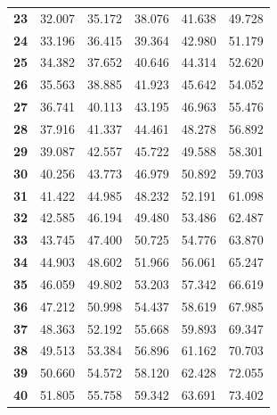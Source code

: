 \begin{center}
\begin{tabular}{c|c|c|c|c|c}
\textbf{23} & 32.007 & 35.172 & 38.076 & 41.638 & 49.728 \\
\textbf{24} & 33.196 & 36.415 & 39.364 & 42.980 & 51.179 \\
\textbf{25} & 34.382 & 37.652 & 40.646 & 44.314 & 52.620 \\
\textbf{26} & 35.563 & 38.885 & 41.923 & 45.642 & 54.052 \\
\textbf{27} & 36.741 & 40.113 & 43.195 & 46.963 & 55.476 \\
\textbf{28} & 37.916 & 41.337 & 44.461 & 48.278 & 56.892 \\
\textbf{29} & 39.087 & 42.557 & 45.722 & 49.588 & 58.301 \\
\textbf{30} & 40.256 & 43.773 & 46.979 & 50.892 & 59.703 \\
\textbf{31} & 41.422 & 44.985 & 48.232 & 52.191 & 61.098 \\
\textbf{32} & 42.585 & 46.194 & 49.480 & 53.486 & 62.487 \\
\textbf{33} & 43.745 & 47.400 & 50.725 & 54.776 & 63.870 \\
\textbf{34} & 44.903 & 48.602 & 51.966 & 56.061 & 65.247 \\
\textbf{35} & 46.059 & 49.802 & 53.203 & 57.342 & 66.619 \\
\textbf{36} & 47.212 & 50.998 & 54.437 & 58.619 & 67.985 \\
\textbf{37} & 48.363 & 52.192 & 55.668 & 59.893 & 69.347 \\
\textbf{38} & 49.513 & 53.384 & 56.896 & 61.162 & 70.703 \\
\textbf{39} & 50.660 & 54.572 & 58.120 & 62.428 & 72.055 \\
\textbf{40} & 51.805 & 55.758 & 59.342 & 63.691 & 73.402 \bstrut\\
\hline
\end{tabular}
\end{center}

\clearpage %